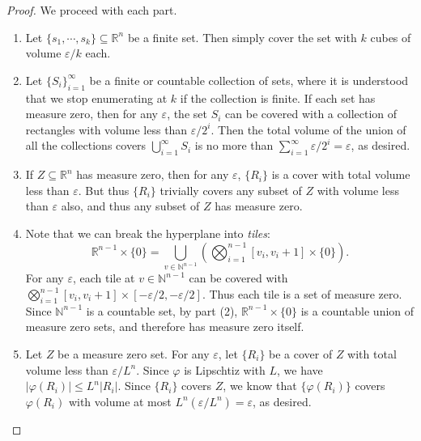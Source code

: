 \documentclass[12pt]{article}
\theoremstyle{remark}
\theoremstyle{named}
\newcommand{\e}{\varepsilon}
\newcommand{\N}{\mathbb N}
\newcommand{\R}{\mathbb R}
\begin{document}
\begin{proof}
    We proceed with each part.
    \begin{enumerate}
        \item Let \(\{s_1, \cdots, s_k\} \subseteq \R^n\) be a finite set. Then simply cover the set with \(k\) cubes of volume \(\e / k\) each.
        \item Let \(\{S_i\}_{i = 1}^\infty\) be a finite or countable collection of sets, where it is understood that we stop enumerating at \(k\) if the collection is finite. If each set has measure zero, then for any \(\e\), the set \(S_i\) can be covered with a collection of rectangles with volume less than \(\e / 2^i\). Then the total volume of the union of all the collections covers \(\bigcup_{i = 1}^\infty S_i\) is no more than \(\sum_{i = 1}^\infty \e / 2^i = \e\), as desired.
        \item If \(Z \subseteq \R^n\) has measure zero, then for any \(\e\), \(\{R_i\}\) is a cover with total volume less than \(\e\). But thus \(\{R_i\}\) trivially covers any subset of \(Z\) with volume less than \(\e\) also, and thus any subset of \(Z\) has measure zero.
        \item Note that we can break the hyperplane into \textit{tiles}:
        \[\R^{n - 1} \times \{0\} = \bigcup_{v \in \N^{n - 1}}\left(\bigotimes_{i = 1}^{n - 1} [v_i, v_i + 1] \times \{0\}\right).\]
        For any \(\e\), each tile at \(v \in \N^{n - 1}\) can be covered with \(\bigotimes_{i = 1}^{n - 1} [v_i, v_i + 1] \times [-\e/2, -\e/2]\). Thus each tile is a set of measure zero. Since \(\N^{n - 1}\) is a countable set, by part (2), \(\R^{n - 1} \times \{0\}\) is a countable union of measure zero sets, and therefore has measure zero itself.
        \item Let \(Z\) be a measure zero set. For any \(\e\), let \(\{R_i\}\) be a cover of \(Z\) with total volume less than \(\e / L^n\). Since \(\varphi\) is Lipschtiz with \(L\), we have \(|\varphi(R_i)| \leq L^n|R_i|\). Since \(\{R_i\}\) covers \(Z\), we know that \(\{\varphi(R_i)\}\) covers \(\varphi(R_i)\) with volume at most \(L^n (\e / L^n) = \e\), as desired.
    \end{enumerate}
\end{proof}
\end{document}
